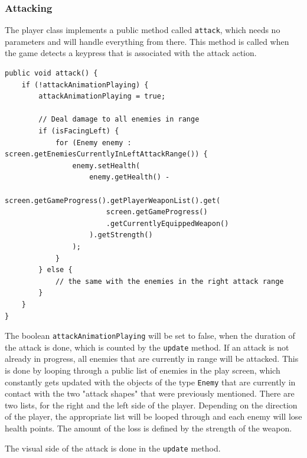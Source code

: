 \documentclass[12p]{article}
\begin{document}
\newpage
\subsubsection{Attacking}

The player class implements a public method called \texttt{attack}, which needs no parameters and will handle everything from there. This method is called when the game detects a keypress that is associated with the attack action.

\begin{verbatim}
public void attack() {
    if (!attackAnimationPlaying) {
        attackAnimationPlaying = true;

        // Deal damage to all enemies in range
        if (isFacingLeft) {
            for (Enemy enemy : screen.getEnemiesCurrentlyInLeftAttackRange()) {
                enemy.setHealth(
                    enemy.getHealth() - 
                    screen.getGameProgress().getPlayerWeaponList().get(
                        screen.getGameProgress()
                        .getCurrentlyEquippedWeapon()
                    ).getStrength()
                );
            }
        } else {
            // the same with the enemies in the right attack range
        }
    }
}
\end{verbatim}

The boolean \texttt{attackAnimationPlaying} will be set to false, when the duration of the attack is done, which is counted by the \texttt{update} method. If an attack is not already in progress, all enemies that are currently in range will be attacked. This is done by looping through a public list of enemies in the play screen, which constantly gets updated with the objects of the type \texttt{Enemy} that are currently in contact with the two "attack shapes" that were previously mentioned. There are two lists, for the right and the left side of the player. Depending on the direction of the player, the appropriate list will be looped through and each enemy will lose health points. The amount of the loss is defined by the strength of the weapon.

The visual side of the attack is done in the \texttt{update} method.

\newpage
\end{document}
